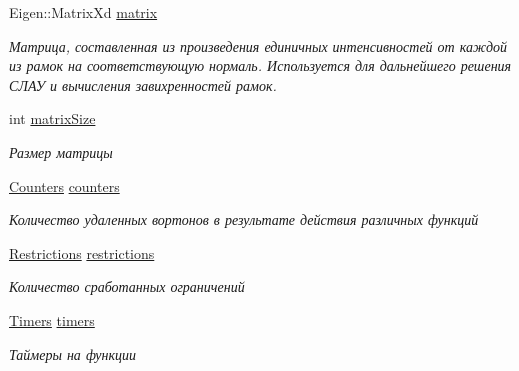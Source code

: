 \begin{DoxyCompactItemize}
\item 
\mbox{\label{class_frame_calculations_ab3ba753d8837dd08a5bc79167bd0c058}} 
Eigen\+::\+Matrix\+Xd \mbox{\hyperlink{class_frame_calculations_ab3ba753d8837dd08a5bc79167bd0c058}{matrix}}
\begin{DoxyCompactList}\small\item\em Матрица, составленная из произведения единичных интенсивностей от каждой из рамок на соответствующую нормаль. Используется для дальнейшего решения СЛАУ и вычисления завихренностей рамок. \end{DoxyCompactList}\item 
\mbox{\label{class_frame_calculations_ad5b30f8065f1cc4f76dfd8972c668524}} 
int \mbox{\hyperlink{class_frame_calculations_ad5b30f8065f1cc4f76dfd8972c668524}{matrix\+Size}}
\begin{DoxyCompactList}\small\item\em Размер матрицы \end{DoxyCompactList}\item 
\mbox{\label{class_frame_calculations_afc998f9041eec85da5b0646d441b1bff}} 
\mbox{\hyperlink{struct_counters}{Counters}} \mbox{\hyperlink{class_frame_calculations_afc998f9041eec85da5b0646d441b1bff}{counters}}
\begin{DoxyCompactList}\small\item\em Количество удаленных вортонов в результате действия различных функций \end{DoxyCompactList}\item 
\mbox{\label{class_frame_calculations_a0413851b46b65f387b57148406d68caa}} 
\mbox{\hyperlink{struct_restrictions}{Restrictions}} \mbox{\hyperlink{class_frame_calculations_a0413851b46b65f387b57148406d68caa}{restrictions}}
\begin{DoxyCompactList}\small\item\em Количество сработанных ограничений \end{DoxyCompactList}\item 
\mbox{\label{class_frame_calculations_a0d2282b3ff7496733a6004241e0740c3}} 
\mbox{\hyperlink{struct_timers}{Timers}} \mbox{\hyperlink{class_frame_calculations_a0d2282b3ff7496733a6004241e0740c3}{timers}}
\begin{DoxyCompactList}\small\item\em Таймеры на функции \end{DoxyCompactList}\end{DoxyCompactItemize}


